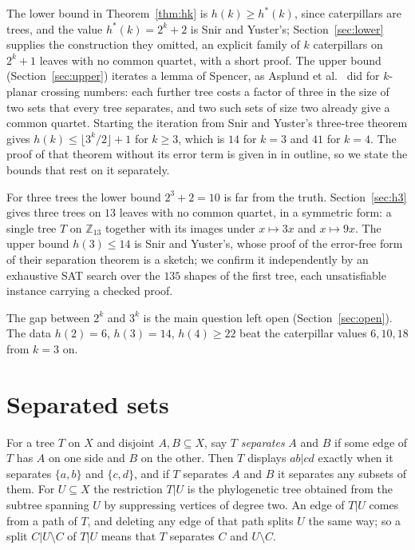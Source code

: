 \documentclass[11pt]{amsart}
\theoremstyle{definition}
\begin{document}
The lower bound in Theorem~\ref{thm:hk} is $h(k)\ge h^*(k)$, since caterpillars are trees, and the value
$h^*(k)=2^k+2$ is Snir and Yuster's; Section~\ref{sec:lower} supplies the construction they omitted, an explicit
family of $k$ caterpillars on $2^k+1$ leaves with no common quartet, with a short proof. The upper bound
(Section~\ref{sec:upper}) iterates a lemma of Spencer, as Asplund et al.\ \cite{ADHSTW} did for $k$-planar crossing
numbers: each further tree costs a factor of three in the size of two sets that every tree separates, and two such
sets of size two already give a common quartet. Starting the iteration from Snir and Yuster's three-tree theorem
gives $h(k)\le\lfloor 3^k/2\rfloor+1$ for $k\ge3$, which is $14$ for $k=3$ and $41$ for $k=4$. The proof of that
theorem without its error term is given in \cite{SY} in outline, so we state the bounds that rest on it separately.

For three trees the lower bound $2^3+2=10$ is far from the truth. Section~\ref{sec:h3} gives three trees on $13$
leaves with no common quartet, in a symmetric form: a single tree $T$ on $\mathbb{Z}_{13}$ together with its images
under $x\mapsto 3x$ and $x\mapsto 9x$. The upper bound $h(3)\le14$ is Snir and Yuster's, whose proof of the
error-free form of their separation theorem is a sketch; we confirm it independently by an exhaustive SAT search
over the $135$ shapes of the first tree, each unsatisfiable instance carrying a checked proof.

The gap between $2^k$ and $3^k$ is the main question left open (Section~\ref{sec:open}). The data $h(2)=6$,
$h(3)=14$, $h(4)\ge22$ beat the caterpillar values $6,10,18$ from $k=3$ on.

\section{Separated sets}\label{sec:prelim}

For a tree $T$ on $X$ and disjoint $A,B\subseteq X$, say $T$ \emph{separates} $A$ and $B$ if some edge of $T$ has
$A$ on one side and $B$ on the other. Then $T$ displays $ab|cd$ exactly when it separates $\{a,b\}$ and $\{c,d\}$, and
if $T$ separates $A$ and $B$ it separates any subsets of them. For $U\subseteq X$ the restriction $T|U$ is the
phylogenetic tree obtained from the subtree spanning $U$ by suppressing vertices of degree two. An edge of $T|U$
comes from a path of $T$, and deleting any edge of that path splits $U$ the same way; so a split $C|U\setminus C$ of
$T|U$ means that $T$ separates $C$ and $U\setminus C$.
\end{document}
